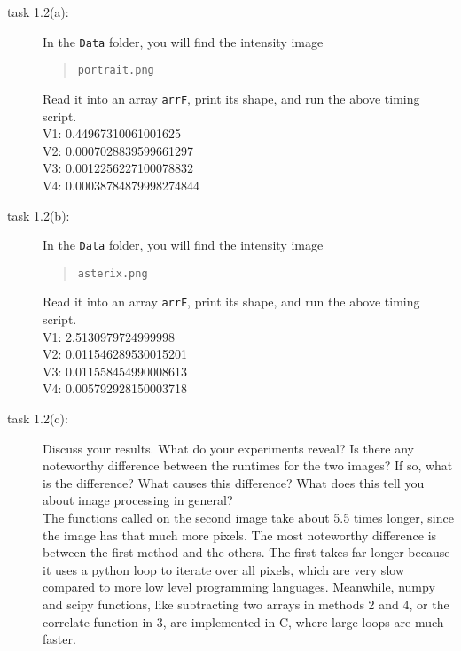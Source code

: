 \begin{description}
\item[task 1.2(a):] In the \texttt{Data} folder, you will find the intensity image
\begin{quote}
    \texttt{portrait.png}
\end{quote}
Read it into an array \texttt{arrF}, print its shape, and run the above timing script.
\color{blue} \\[1ex]
V1: 0.44967310061001625 \\
V2: 0.0007028839599661297 \\
V3: 0.0012256227100078832 \\
V4: 0.00038784879998274844 \\
\color{black}

\item[task 1.2(b):] In the \texttt{Data} folder, you will find the intensity image
\begin{quote}
    \texttt{asterix.png}
\end{quote}
Read it into an array \texttt{arrF}, print its shape, and run the above timing script.
\color{blue} \\[1ex]
V1: 2.5130979724999998 \\
V2: 0.011546289530015201 \\
V3: 0.011558454990008613 \\
V4: 0.005792928150003718 \\
\color{black}

\newpage
\item[task 1.2(c):] Discuss your results. What do your experiments reveal? Is there any noteworthy difference between the runtimes for the two images? If so, what is the difference? What causes this difference? What does this tell you about image processing in general?
\color{blue} \\[1ex]
The functions called on the second image take about 5.5 times longer, since the image has that much more pixels. The most noteworthy difference is between the first method and the others. The first takes far longer because it uses a python loop to iterate over all pixels, which are very slow compared to more low level programming languages. Meanwhile, numpy and scipy functions, like subtracting two arrays in methods 2 and 4, or the correlate function in 3, are implemented in C, where large loops are much faster.
\color{black}
\end{description}



